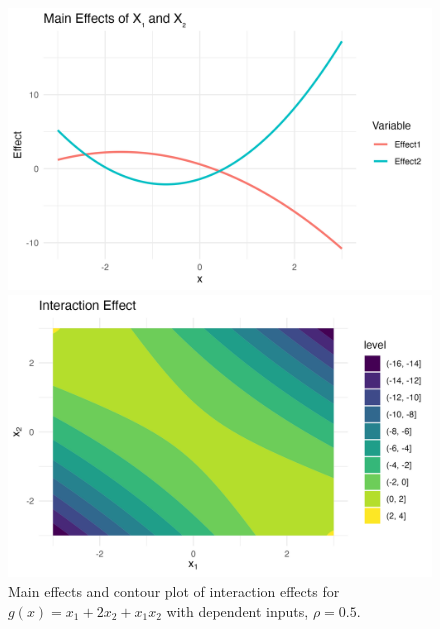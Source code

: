 \begin{figure}[htpb]
    \centering
    \begin{minipage}[t]{0.49\textwidth}
        \centering
        \includegraphics[width=\textwidth]{images/full_a1m20_a2p20_a11m10_a22p10_a12m10_rhom05_main.png}
    \end{minipage}%
    \hfill
    \begin{minipage}[t]{0.49\textwidth}
        \centering
        \includegraphics[width=\textwidth]{images/full_a1m20_a2p20_a11m10_a22p10_a12m10_rhom05_interaction.png}
        \caption{Main effects and contour plot of interaction effects for $g(x) = x_1 + 2 x_2 + x_1 x_2$ with dependent inputs, $\rho = 0.5$.}
        \label{fig:full_rho_pos0.5}
    \end{minipage}
\end{figure}